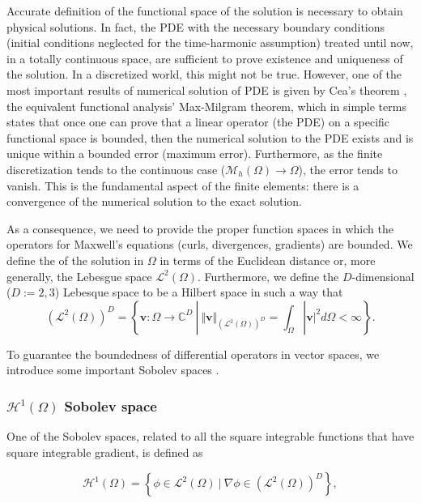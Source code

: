 Accurate definition of the functional space of the solution is necessary to obtain physical solutions. In fact, the PDE with the necessary boundary conditions (initial conditions neglected for the time-harmonic assumption) treated until now, in a totally continuous space, are sufficient to prove existence and uniqueness of the solution. In a discretized world, this might not be true. However, one of the most important results of numerical solution of PDE is given by Cea's theorem \cite{ciarlet1978finite}, the equivalent functional analysis' Max-Milgram theorem, which in simple terms states that once one can prove that a linear operator (the PDE) on a specific functional space is bounded, then the numerical solution to the PDE exists and is unique within a bounded error (maximum error). Furthermore, as the finite discretization tends to the continuous case ($\mathcal{M}_h(\Omega) \rightarrow \Omega$), the error tends to vanish. This is the fundamental aspect of the finite elements: there is a convergence of the numerical solution to the exact solution. 

As a consequence, we need to provide the proper function spaces in which the operators for Maxwell's equations (curls, divergences, gradients) are bounded. We define the  of the solution in $\Omega$ in terms of the Euclidean distance or, more generally, the Lebesgue space $\mathcal{L}^2(\Omega)$. Furthermore, we define the $D$-dimensional ($D := 2,3$) Lebesque space to be a Hilbert space in such a way that
$$\left (\mathcal{L}^2(\Omega)\right)^D = \left \lbrace \mathbf{v} : \Omega \rightarrow \mathbb{C}^D \ | \ \Vert \mathbf{v}\Vert_{(\mathcal{L}^2(\Omega))^D }  = \int_\Omega |\mathbf{v}|^2 d\Omega < \infty \right \rbrace.$$

To guarantee the boundedness of differential operators in vector spaces, we introduce some important Sobolev spaces \cite{monk2003finite}.

\subsubsection{\texorpdfstring{$\mathcal{H}^1(\Omega)$ Sobolev space}{H1 Sobolev space}}

One of the Sobolev spaces, related to all the square integrable functions that have square integrable gradient, is defined as

$$\mathcal{H}^1(\Omega) = \left \lbrace \phi \in \mathcal{L}^2(\Omega) \ | \ \nabla \phi \in (\mathcal{L}^2(\Omega))^D \right \rbrace,$$

